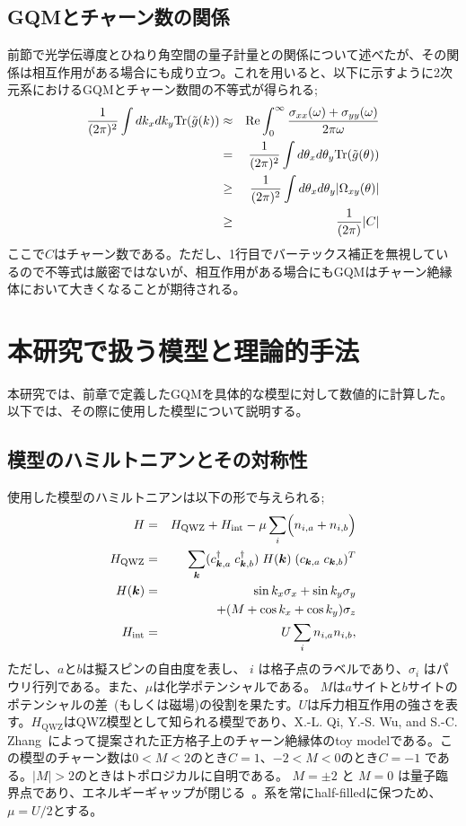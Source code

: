 \documentclass[12pt]{jsbook}
\newcommand{\bk}{\bm{k}}
\begin{document}
\section{GQMとチャーン数の関係}
前節で光学伝導度とひねり角空間の量子計量との関係について述べたが、その関係は相互作用がある場合にも成り立つ。これを用いると、以下に示すように2次元系におけるGQMとチャーン数間の不等式が得られる;
\begin{eqnarray}
    {1\over (2\pi)^2}\int dk_xdk_y \mathrm{Tr}(\tilde{g}(k))&\approx& \mathrm{Re}\int_0^\infty {\sigma_{xx}(\omega) + \sigma_{yy}(\omega)\over 2\pi\omega}\nonumber\\
    &=&{1\over (2\pi)^2}\int d\theta_xd\theta_y \mathrm{Tr}(\tilde{g}(\theta))\nonumber\\
    &\geq& {1\over (2\pi)^2}\int d\theta_xd\theta_y |\Omega_{xy}(\theta)|\nonumber\\
    &\geq& {1\over (2\pi)}|C|
\end{eqnarray}
ここで$C$はチャーン数である。ただし、1行目でバーテックス補正を無視しているので不等式は厳密ではないが、相互作用がある場合にもGQMはチャーン絶縁体において大きくなることが期待される。
\chapter{本研究で扱う模型と理論的手法}
本研究では、前章で定義したGQMを具体的な模型に対して数値的に計算した。以下では、その際に使用した模型について説明する。
\section{模型のハミルトニアンとその対称性}%
使用した模型のハミルトニアンは以下の形で与えられる;
\begin{eqnarray}
H &=& H_{\mathrm{QWZ}} + H_{\mathrm{int}}-\mu \displaystyle \sum_i \Bigl(n_{i,a}+n_{i,b}\Bigr)\\
H_{\mathrm{QWZ}} &=& \displaystyle \sum_{\bk} (c^{\dagger}_{\bk,a}\; c^{\dagger}_{\bk,b})\;H(\bk)\;(c_{\bk,a}\; c_{\bk,b})^{T}\\
H(\bk) &=& \sin k_x\sigma_x + \sin k_y\sigma_y \nonumber\\
&& \ \ \ + (M+\cos k_x +\cos k_y)\sigma_z\\
H_\mathrm{int} &=& U\displaystyle \sum_i n_{i,a}n_{i,b}, 
\end{eqnarray}
ただし、$a$と$b$は擬スピンの自由度を表し、 $i$ は格子点のラベルであり、$\sigma_i$ はパウリ行列である。また、$\mu$は化学ポテンシャルである。 $M$は$a$サイトと$b$サイトのポテンシャルの差~\cite{asboth2016short}(もしくは磁場)の役割を果たす。$U$は斥力相互作用の強さを表す。$H_\mathrm{QWZ}$はQWZ模型として知られる模型であり、X.-L. Qi, Y.-S. Wu, and S.-C. Zhang~\cite{PhysRevB.74.085308,asboth2016short}によって提案された正方格子上のチャーン絶縁体のtoy modelである。この模型のチャーン数は$0 < M < 2$のとき$C=1$、$-2 < M < 0$のとき$C=-1$ である。$\vert M\vert >2$のときはトポロジカルに自明である。 $M=\pm 2$ と $M=0$ は量子臨界点であり、エネルギーギャップが閉じる~\cite{asboth2016short}。系を常にhalf-filledに保つため、$\mu=U/2$とする。
\end{document}
